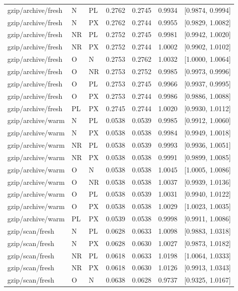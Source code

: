 \begin{longtable}{lllrrrr}
gzip/archive/fresh & N & PL & 0.2762 & 0.2745 & 0.9934 & [0.9874, 0.9994] \\
gzip/archive/fresh & N & PX & 0.2762 & 0.2744 & 0.9955 & [0.9829, 1.0082] \\
gzip/archive/fresh & NR & PL & 0.2752 & 0.2745 & 0.9981 & [0.9942, 1.0020] \\
gzip/archive/fresh & NR & PX & 0.2752 & 0.2744 & 1.0002 & [0.9902, 1.0102] \\
gzip/archive/fresh & O & N & 0.2753 & 0.2762 & 1.0032 & [1.0000, 1.0064] \\
gzip/archive/fresh & O & NR & 0.2753 & 0.2752 & 0.9985 & [0.9973, 0.9996] \\
gzip/archive/fresh & O & PL & 0.2753 & 0.2745 & 0.9966 & [0.9937, 0.9995] \\
gzip/archive/fresh & O & PX & 0.2753 & 0.2744 & 0.9986 & [0.9886, 1.0088] \\
gzip/archive/fresh & PL & PX & 0.2745 & 0.2744 & 1.0020 & [0.9930, 1.0112] \\
gzip/archive/warm & N & PL & 0.0538 & 0.0539 & 0.9985 & [0.9912, 1.0060] \\
gzip/archive/warm & N & PX & 0.0538 & 0.0538 & 0.9984 & [0.9949, 1.0018] \\
gzip/archive/warm & NR & PL & 0.0538 & 0.0539 & 0.9993 & [0.9936, 1.0051] \\
gzip/archive/warm & NR & PX & 0.0538 & 0.0538 & 0.9991 & [0.9899, 1.0085] \\
gzip/archive/warm & O & N & 0.0538 & 0.0538 & 1.0045 & [1.0005, 1.0086] \\
gzip/archive/warm & O & NR & 0.0538 & 0.0538 & 1.0037 & [0.9939, 1.0136] \\
gzip/archive/warm & O & PL & 0.0538 & 0.0539 & 1.0031 & [0.9940, 1.0122] \\
gzip/archive/warm & O & PX & 0.0538 & 0.0538 & 1.0029 & [1.0023, 1.0035] \\
gzip/archive/warm & PL & PX & 0.0539 & 0.0538 & 0.9998 & [0.9911, 1.0086] \\
gzip/scan/fresh & N & PL & 0.0628 & 0.0633 & 1.0098 & [0.9883, 1.0318] \\
gzip/scan/fresh & N & PX & 0.0628 & 0.0630 & 1.0027 & [0.9873, 1.0182] \\
gzip/scan/fresh & NR & PL & 0.0618 & 0.0633 & 1.0198 & [1.0064, 1.0333] \\
gzip/scan/fresh & NR & PX & 0.0618 & 0.0630 & 1.0126 & [0.9913, 1.0343] \\
gzip/scan/fresh & O & N & 0.0638 & 0.0628 & 0.9737 & [0.9325, 1.0167] \\

\end{longtable}
